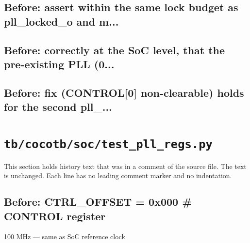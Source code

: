 \begin{record}

\subsection*{Before: assert within the same lock budget as pll\_locked\_o and m...}


\subsection*{Before: correctly at the SoC level, that the pre-existing PLL (0...}


\subsection*{Before: fix (CONTROL[0] non-clearable) holds for the second pll\_...}


\end{record}

\section{\texttt{tb/cocotb/soc/test\_pll\_regs.py}}\label{cr:suite:soc-test-pll-regs}

This section holds history text that was in a comment of the source file. The text is unchanged. Each line has no leading comment marker and no indentation.

\begin{record}

\subsection*{Before: CTRL\_OFFSET  = 0x000   \# CONTROL register}

\begin{textblock}
100 MHz — same as SoC reference clock
\end{textblock}

\end{record}

